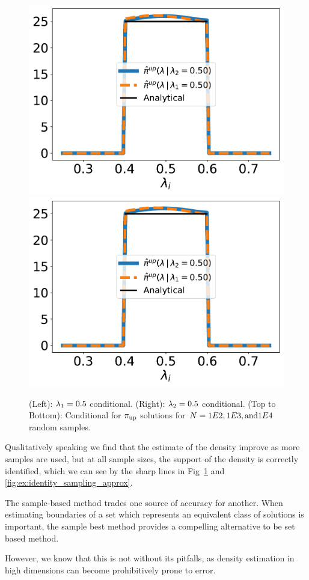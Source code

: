 \begin{figure}[ht]
\begin{minipage}{.975\textwidth}
\end{minipage}
\begin{minipage}{.975\textwidth}
		\includegraphics[width=0.5\linewidth]{./examples/identity/samp/identity_1d_conditionals_50E-2_N10000_approx.pdf}
		\includegraphics[width=0.5\linewidth]{./examples/identity/samp/identity_1d_conditionals_50E-2_N10000_approx.pdf}
\end{minipage}
\caption{
(Left): $\lambda_1=0.5$ conditional.
(Right): $\lambda_2=0.5$ conditional.
(Top to Bottom): Conditional for $\operatorname*{\pi_{up}}$ solutions for  $N=1E2, 1E3, \text{and} 1E4$ random samples.
}
\label{fig:identity_sampling_conditionals}
\end{figure}
\FloatBarrier

Qualitatively speaking we find that the estimate of the density improve as more samples are used, but at all sample sizes, the support of the density is correctly identified, which we can see by the sharp lines in Fig~\ref{fig:identity_sampling_conditionals} and \ref{fig:ex:identity_sampling_approx}.

The sample-based method trades one source of accuracy for another.
When estimating boundaries of a set which represents an equivalent class of solutions is important, the sample best method provides a compelling alternative to be set based method.

However, we know that this is not without its pitfalls, as density estimation in high dimensions can become prohibitively prone to error.
